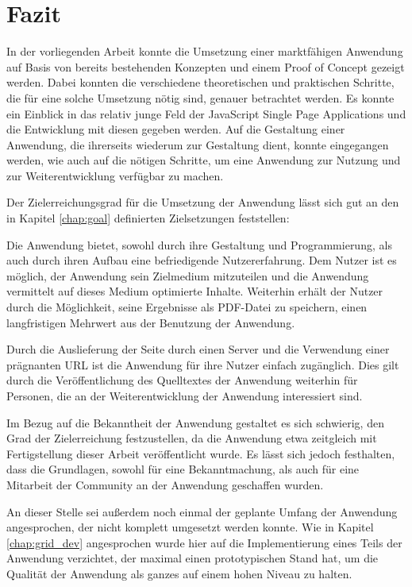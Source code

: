 \chapter{Fazit}
\thispagestyle{fancy}

In der vorliegenden Arbeit konnte die Umsetzung einer marktfähigen Anwendung auf Basis von bereits bestehenden Konzepten und einem Proof of Concept gezeigt werden.
Dabei konnten die verschiedene theoretischen und praktischen Schritte, die für eine solche Umsetzung nötig sind, genauer betrachtet werden.
Es konnte ein Einblick in das relativ junge Feld der JavaScript Single Page Applications und die Entwicklung mit diesen gegeben werden. Auf die Gestaltung einer Anwendung, die ihrerseits wiederum zur Gestaltung dient, konnte eingegangen werden, wie auch auf die nötigen Schritte, um eine Anwendung zur Nutzung und zur Weiterentwicklung verfügbar zu machen.

Der Zielerreichungsgrad für die Umsetzung der Anwendung lässt sich gut an den in Kapitel \ref{chap:goal} definierten Zielsetzungen feststellen:

Die Anwendung bietet, sowohl durch ihre Gestaltung und Programmierung, als auch durch ihren Aufbau eine befriedigende Nutzererfahrung. Dem Nutzer ist es möglich, der Anwendung sein Zielmedium mitzuteilen und die Anwendung vermittelt auf dieses Medium optimierte Inhalte. Weiterhin erhält der Nutzer durch die Möglichkeit, seine Ergebnisse als PDF-Datei zu speichern, einen langfristigen Mehrwert aus der Benutzung der Anwendung.

Durch die Auslieferung der Seite durch einen Server und die Verwendung einer prägnanten URL ist die Anwendung für ihre Nutzer einfach zugänglich. Dies gilt durch die Veröffentlichung des Quelltextes der Anwendung weiterhin für Personen, die an der Weiterentwicklung der Anwendung interessiert sind.

Im Bezug auf die Bekanntheit der Anwendung gestaltet es sich schwierig, den Grad der Zielerreichung festzustellen, da die Anwendung etwa zeitgleich mit Fertigstellung dieser Arbeit veröffentlicht wurde.
Es lässt sich jedoch festhalten, dass die Grundlagen, sowohl für eine Bekanntmachung, als auch für eine Mitarbeit der Community an der Anwendung geschaffen wurden.

An dieser Stelle sei außerdem noch einmal der geplante Umfang der Anwendung angesprochen, der nicht komplett umgesetzt werden konnte.
Wie in Kapitel \ref{chap:grid_dev} angesprochen wurde hier auf die Implementierung eines Teils der Anwendung verzichtet, der maximal einen prototypischen Stand hat, um die Qualität der Anwendung als ganzes auf einem hohen Niveau zu halten.

